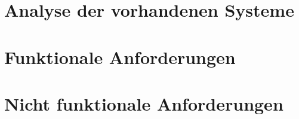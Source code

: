 \section{Analyse der vorhandenen Systeme}

\section{Funktionale Anforderungen}

\section{Nicht funktionale Anforderungen}

